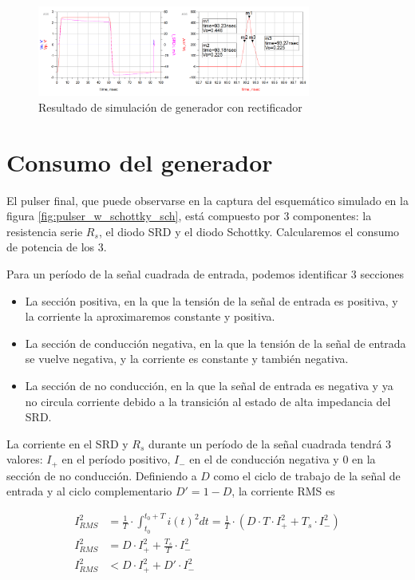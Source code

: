\begin{figure}[tbp]
    \centering
    \includegraphics[width=0.8\textwidth]{images/pulser_w_schottky_sim_result.png}
    \caption{Resultado de simulación de generador con rectificador}
    \label{fig:pulser_w_schottky_sim_result}
\end{figure}

\section{Consumo del generador}
\label{sec:pulser_power}

El pulser final, que puede observarse en la captura del esquemático simulado en
la figura \ref{fig:pulser_w_schottky_sch}, está compuesto por 3 componentes: la
resistencia serie $R_s$, el diodo SRD y el diodo Schottky. Calcularemos el
consumo de potencia de los 3.

Para un período de la señal cuadrada de entrada, podemos identificar 3 secciones

\begin{itemize}
    \item La sección positiva, en la que la tensión de la señal de entrada es
        positiva, y la corriente la aproximaremos constante y positiva.
    \item La sección de conducción negativa, en la que la tensión de la señal de
        entrada se vuelve negativa, y la corriente es constante y también
        negativa.
    \item La sección de no conducción, en la que la señal de entrada es
        negativa y ya no circula corriente debido a la transición al estado de
        alta impedancia del SRD.
\end{itemize}

La corriente en el SRD y $R_s$ durante un período de la señal cuadrada tendrá 3
valores: $I_+$ en el período positivo, $I_-$ en el de conducción negativa y $0$
en la sección de no conducción. Definiendo a $D$ como el ciclo de trabajo de la
señal de entrada y al ciclo complementario $D'=1-D$, la corriente RMS es

\begin{equation}
    \begin{aligned}
        I_{RMS}^2 &= \frac{1}{T} \cdot \int_{t_0}^{t_0+T} i(t)^2dt = \frac{1}{T}
        \cdot \left( D \cdot T \cdot I_+^2 + T_s \cdot I_-^2 \right) \\
        I_{RMS}^2 &= D \cdot I_+^2 + \frac{T_s}{T} \cdot I_-^2 \\
        I_{RMS}^2 &< D \cdot I_+^2 + D' \cdot I_-^2 \\
    \end{aligned}
\end{equation}

